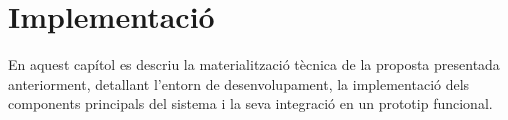 \section{Implementació}
\label{cap:implementation}

En aquest capítol es descriu la materialització tècnica de la proposta presentada anteriorment, detallant l’entorn de desenvolupament, la implementació dels components principals del sistema i la seva integració en un prototip funcional.










